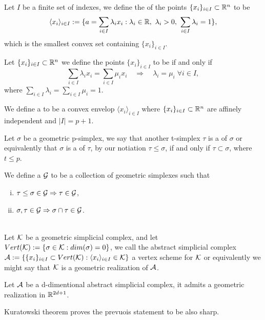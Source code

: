 \documentclass[../1.tex]{subfiles}
\begin{document}
    \begin{defn}
        Let $I$ be a finite set of indexes, we define the  of the points $\{x_i\}_{i \in I} \subset \mathbb{R}^n$ to be 
        \[ \langle x_i \rangle_{i \in I} := \{ a = \sum_{i \in I} \lambda_i x_i : \lambda_i \in \mathbb{R},\ \lambda_i > 0,\  \sum_{i \in I} \lambda_i = 1 \},\]
        which is the smallest convex set containing $\{x_i\}_{i \in I}$.
    \end{defn}

    \begin{defn}
        Let $\{x_i\}_{i \in I} \subset \mathbb{R}^n$ we define the points $\{x_i\}_{i \in I}$ to be  if and only if
        \[ \sum_{i \in I} \lambda_i x_i = \sum_{i \in I} \mu_i x_i \quad \Rightarrow \quad 
        \lambda_i = \mu_i \; \forall i \in I ,\]
        where $\sum_{i \in I} \lambda_i = \sum_{i \in I} \mu_i = 1$.
    \end{defn}

    \begin{defn}
        We define a  to be a convex envelop $\langle x_i \rangle_{i \in I}$
        where $\{x_i\}_{i \in I} \subset \mathbb{R}^n$ are affinely independent and $|I| = p + 1$.
    \end{defn}
    
    \begin{defn}
        Let $\sigma$ be a geometric p-simplex, we say that another t-simplex $\tau$ is a  of $\sigma$ or equivalently 
        that $\sigma$ is a  of $\tau$, by our notiation $\tau \leq \sigma$, if and only if $\tau \subset \sigma$, where $t \leq p$.
    \end{defn}

    \begin{defn}
        We define a  $\mathcal{G}$ to be a collection of geometric simplexes such that
        \begin{enumerate}[(i)]
            \item $ \tau \leq \sigma \in \mathcal{G} \Rightarrow \tau \in \mathcal{G} $,
            \item $ \sigma, \tau \in \mathcal{G} \Rightarrow \sigma \cap \tau \in \mathcal{G}  $.
        \end{enumerate}
    \end{defn}

    \newpage

    \begin{defn}
        \\
        Let $\mathcal{K}$ be a geometric simplicial complex, and let $Vert(\mathcal{K}) := \{\sigma \in \mathcal{K} : dim(\sigma) = 0\}$, we call
        the abstract simplicial complex $\mathcal{A} := \{ \{x_i\}_{i \in I} \subset Vert(\mathcal{K}) : \langle x_i \rangle_{i \in I} \in \mathcal{K} \}$
        a vertex scheme for $\mathcal{K}$ or equivalently we might say that $\mathcal{K}$ is a geometric realization of $\mathcal{A}$.
    \end{defn}
    \begin{thm}
        Let $\mathcal{A}$ be a d-dimentional abstract simplicial complex, it admits a geometric realization in $\mathbb{R}^{2d+1}$.
    \end{thm}
    Kuratowski theorem proves the prevuois statement to be also sharp.
\end{document}
